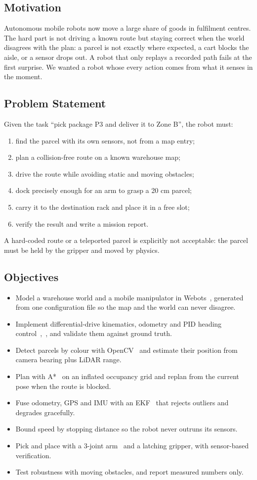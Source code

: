 \documentclass[conference]{IEEEtran}
\begin{document}
\subsection{Motivation}
Autonomous mobile robots now move a large share of goods in fulfilment centres. The hard part is not driving a known route but staying correct when the world disagrees with the plan: a parcel is not exactly where expected, a cart blocks the aisle, or a sensor drops out. A robot that only replays a recorded path fails at the first surprise. We wanted a robot whose every action comes from what it senses in the moment.

\subsection{Problem Statement}
Given the task ``pick package P3 and deliver it to Zone B'', the robot must:

\begin{enumerate}
\item find the parcel with its own sensors, not from a map entry;
\item plan a collision-free route on a known warehouse map;
\item drive the route while avoiding static and moving obstacles;
\item dock precisely enough for an arm to grasp a 20 cm parcel;
\item carry it to the destination rack and place it in a free slot;
\item verify the result and write a mission report.
\end{enumerate}
A hard-coded route or a teleported parcel is explicitly not acceptable: the parcel must be held by the gripper and moved by physics.

\subsection{Objectives}
\begin{itemize}
\item Model a warehouse world and a mobile manipulator in Webots~\cite{r1}, generated from one configuration file so the map and the world can never disagree.
\item Implement differential-drive kinematics, odometry and PID heading control~\cite{r4},~\cite{r10}, and validate them against ground truth.
\item Detect parcels by colour with OpenCV~\cite{r8} and estimate their position from camera bearing plus LiDAR range.
\item Plan with A*~\cite{r3} on an inflated occupancy grid and replan from the current pose when the route is blocked.
\item Fuse odometry, GPS and IMU with an EKF~\cite{r2} that rejects outliers and degrades gracefully.
\item Bound speed by stopping distance so the robot never outruns its sensors.
\item Pick and place with a 3-joint arm~\cite{r5} and a latching gripper, with sensor-based verification.
\item Test robustness with moving obstacles, and report measured numbers only.
\end{itemize}
\end{document}

